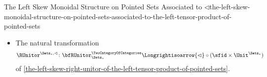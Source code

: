 \begin{proposition}{The Left Skew Monoidal Structure on Pointed Sets Associated to $\lhd$}{the-left-skew-monoidal-structure-on-pointed-sets-associated-to-the-left-tensor-product-of-pointed-sets}
\begin{itemize}
            \[
                \LUnitor^{\Sets_{*},\lhd}%
                \colon%
                {\lhd}\circ{(\Unit^{\Sets_{*}}\times\id_{\Sets_{*}})}%
                \Longrightisoarrow%
                \bfLUnitor^{\TwoCategoryOfCategories}_{\Sets_{*}}%
            \]
            of \cref{the-left-skew-left-unitor-of-the-left-tensor-product-of-pointed-sets};
        \item{}The natural transformation
            \[
                \RUnitor^{\Sets_{*},\lhd}%
                \colon%
                \bfRUnitor^{\TwoCategoryOfCategories}_{\Sets_{*}}%
                \Longrightisoarrow%
                {\lhd}\circ{({\sfid}\times{\Unit^{\Sets_{*}}})}%
            \]
            of \cref{the-left-skew-right-unitor-of-the-left-tensor-product-of-pointed-sets}.
    \end{itemize}
\end{proposition}
